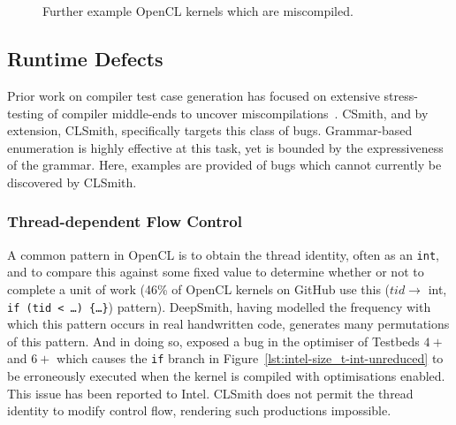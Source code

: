 
\begin{figure}
  \centering %
  \\%
  \\%
  \caption[Further example kernels which are miscompiled]{%
    Further example OpenCL kernels which are miscompiled.%
  }%
\end{figure}


\subsection{Runtime Defects}

Prior work on compiler test case generation has focused on extensive stress-testing of compiler middle-ends to uncover miscompilations~\cite{Chen2014a}. CSmith, and by extension, CLSmith, specifically targets this class of bugs. Grammar-based enumeration is highly effective at this task, yet is bounded by the expressiveness of the grammar. Here, examples are provided of bugs which cannot currently be discovered by CLSmith.


\subsubsection{Thread-dependent Flow Control}

A common pattern in OpenCL is to obtain the thread identity, often as an \texttt{int}, and to compare this against some fixed value to determine whether or not to complete a unit of work (46\% of OpenCL kernels on GitHub use this ($tid \rightarrow$ int, \texttt{if (tid < \ldots) \{\ldots\}}) pattern). DeepSmith, having modelled the frequency with which this pattern occurs in real handwritten code, generates many permutations of this pattern. And in doing so, exposed a bug in the optimiser of Testbeds $4+$ and $6+$ which causes the \texttt{if} branch in Figure~\ref{lst:intel-size_t-int-unreduced} to be erroneously executed when the kernel is compiled with optimisations enabled. This issue has been reported to Intel. CLSmith does not permit the thread identity to modify control flow, rendering such productions impossible.

